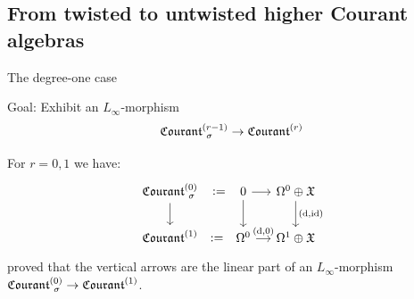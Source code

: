 \documentclass[beamer,10pt]{standalone}
\begin{document}
\subsection{From twisted to untwisted higher Courant algebras}

\begin{frame}{The degree-one case}
	\begin{block}{Goal:}
		Exhibit an $L_\infty$-morphism
		$$ \Courant[\sigma]{r-1} \to \Courant{r}$$
	\end{block}
	\vfill \pause	

	\begin{exblock}
	For $r=0,1$ we have:
	\begin{displaymath}
		\begin{tikzcd}[ampersand replacement=\&,column sep = small]
			\Courant[\sigma]{0} \ar[r,phantom,":="] \ar[d]
			\&[1em]
			0 \ar[r] \ar[d]
			\& \Omega^0\oplus \X \ar[d,"{(\d,\id)}"]
			\\
			\Courant{1} \ar[r,phantom,":="] 
			\&
			\Omega^0 \ar[r,"{(\d,0)}"] 
			\& 
			\Omega^1\oplus \X
		\end{tikzcd}
	\end{displaymath}
	\cite{Zambon2012} proved that the vertical arrows are the linear part of an $L_\infty$-morphism $\Courant[\sigma]{0} \to \Courant{1}$.
	\end{exblock}
	\vfill
	
\end{frame}
\note[itemize]
{
	\item 
}
\end{document}
